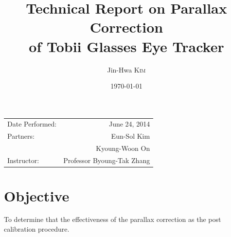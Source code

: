 \documentclass{article}
\title{Technical Report on Parallax Correction \\
of Tobii Glasses Eye Tracker} %
\author{Jin-Hwa \textsc{Kim}} %
\date{\today} %
\begin{document}
\maketitle %

\begin{center}
\begin{tabular}{l r}
Date Performed: & June 24, 2014 \\ %
Partners: & Eun-Sol Kim \\ %
& Kyoung-Woon On \\
Instructor: & Professor Byoung-Tak Zhang %
\end{tabular}
\end{center}



\section{Objective}

To determine that the effectiveness of the parallax correction as the post calibration procedure. 

\end{document}
